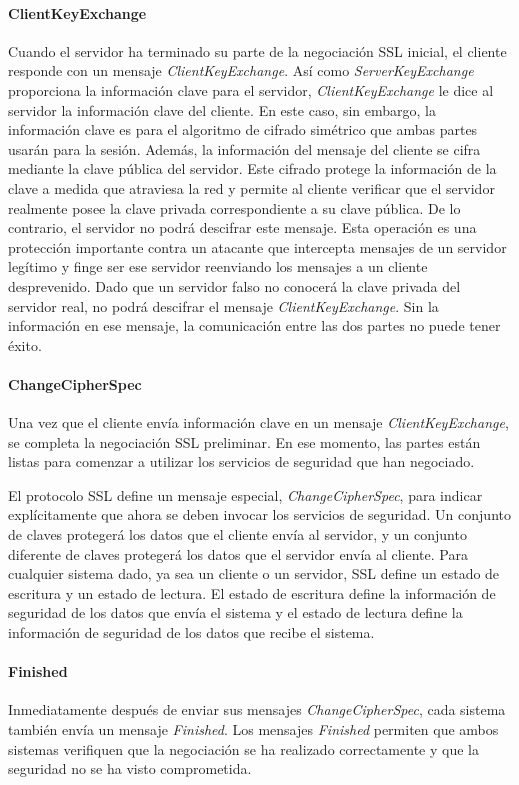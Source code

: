 \paragraph*{ClientKeyExchange}
Cuando el servidor ha terminado su parte de la negociación SSL inicial, 
el cliente responde con un mensaje \emph{ClientKeyExchange}. Así como 
\emph{ServerKeyExchange} proporciona la información clave para el servidor, 
\emph{ClientKeyExchange} le dice al servidor la información clave del cliente. 
En este caso, sin embargo, la información clave es para el algoritmo de 
cifrado simétrico que ambas partes usarán para la sesión. Además, la 
información del mensaje del cliente se cifra mediante la clave pública 
del servidor. Este cifrado protege la información de la clave a medida 
que atraviesa la red y permite al cliente verificar que el servidor 
realmente posee la clave privada correspondiente a su clave pública. 
De lo contrario, el servidor no podrá descifrar este mensaje. Esta 
operación es una protección importante contra un atacante que intercepta 
mensajes de un servidor legítimo y finge ser ese servidor reenviando los 
mensajes a un cliente desprevenido. Dado que un servidor falso no conocerá 
la clave privada del servidor real, no podrá descifrar el mensaje 
\emph{ClientKeyExchange}. Sin la información en ese mensaje, la comunicación 
entre las dos partes no puede tener éxito.
\paragraph*{ChangeCipherSpec}
Una vez que el cliente envía información clave en un mensaje 
\emph{ClientKeyExchange}, se completa la negociación SSL preliminar. En ese 
momento, las partes están listas para comenzar a utilizar los servicios 
de seguridad que han negociado.

El protocolo SSL define un mensaje especial, \emph{ChangeCipherSpec}, para 
indicar explícitamente que ahora se deben invocar los servicios de 
seguridad. Un conjunto de claves protegerá los datos que el cliente 
envía al servidor, y un conjunto diferente de claves protegerá los 
datos que el servidor envía al cliente. Para cualquier sistema dado, 
ya sea un cliente o un servidor, SSL define un estado de escritura y 
un estado de lectura. El estado de escritura define la información de 
seguridad de los datos que envía el sistema y el estado de lectura 
define la información de seguridad de los datos que recibe el sistema.

\paragraph*{Finished}
Inmediatamente después de enviar sus mensajes \emph{ChangeCipherSpec}, cada 
sistema también envía un mensaje \emph{Finished}. Los mensajes \emph{Finished}
permiten que ambos sistemas verifiquen que la negociación se ha realizado 
correctamente y que la seguridad no se ha visto comprometida.

